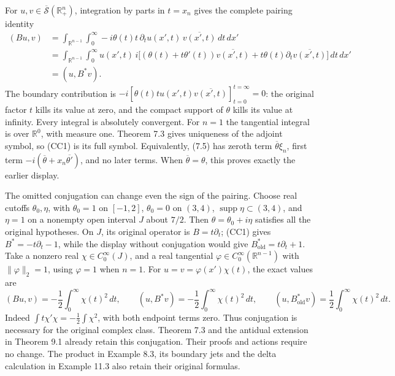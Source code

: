 \documentclass[
  11pt,
]{article}
\begin{document}
For \(u,v\in\overline{\mathcal S}(\mathbb R^n_+)\), integration by parts
in \(t=x_n\) gives the complete pairing identity \[
 \begin{aligned}
 (Bu,v)
 &=\int_{\mathbb R^{n-1}}\int_0^\infty
       -i\theta(t)t\,\partial_tu(x',t)\,\overline{v(x',t)}\,dt\,dx'\\
 &=\int_{\mathbb R^{n-1}}\int_0^\infty
       u(x',t)\,i\big[(\theta(t)+t\theta'(t))\overline{v(x',t)}
                 +t\theta(t)\partial_t\overline{v(x',t)}\big]\,dt\,dx'\\
 &=(u,B^*v).
 \end{aligned}
 \tag{CC2}
\] The boundary contribution is
\(-i[\theta(t)t u(x',t)\overline{v(x',t)}]_{t=0}^{t=\infty}=0\): the
original factor \(t\) kills its value at zero, and the compact support
of \(\theta\) kills its value at infinity. Every integral is absolutely
convergent. For \(n=1\) the tangential integral is over \(\mathbb R^0\),
with measure one. Theorem 7.3 gives uniqueness of the adjoint symbol, so
(CC1) is its full symbol. Equivalently, (7.5) has zeroth term
\(\overline\theta\xi_n\), first term
\(-i(\overline\theta+x_n\overline{\theta'})\), and no later terms. When
\(\overline\theta=\theta\), this proves exactly the earlier display.

The omitted conjugation can change even the sign of the pairing. Choose
real cutoffs \(\theta_0,\eta\), with \(\theta_0=1\) on \([-1,2]\),
\(\theta_0=0\) on \((3,4)\), \(\operatorname{supp}\eta\subset(3,4)\),
and \(\eta=1\) on a nonempty open interval \(J\) about \(7/2\). Then
\(\theta=\theta_0+i\eta\) satisfies all the original hypotheses. On
\(J\), its original operator is \(B=t\partial_t\); (CC1) gives
\(B^*=-t\partial_t-1\), while the display without conjugation would give
\(B_{\mathrm{old}}^*=t\partial_t+1\). Take a nonzero real
\(\chi\in C_0^\infty(J)\), and a real tangential
\(\varphi\in C_0^\infty(\mathbb R^{n-1})\) with \(\|\varphi\|_2=1\),
using \(\varphi=1\) when \(n=1\). For \(u=v=\varphi(x')\chi(t)\), the
exact values are \[
 (Bu,v)=-\frac12\int_0^\infty\chi(t)^2\,dt,
 \qquad
 (u,B^*v)=-\frac12\int_0^\infty\chi(t)^2\,dt,
 \qquad
 (u,B_{\mathrm{old}}^*v)=\frac12\int_0^\infty\chi(t)^2\,dt.
 \tag{CC3}
\] Indeed \(\int t\chi'\chi=-\tfrac12\int\chi^2\), with both endpoint
terms zero. Thus conjugation is necessary for the original complex
class. Theorem 7.3 and the antidual extension in Theorem 9.1 already
retain this conjugation. Their proofs and actions require no change. The
product in Example 8.3, its boundary jets and the delta calculation in
Example 11.3 also retain their original formulas.
\end{document}
